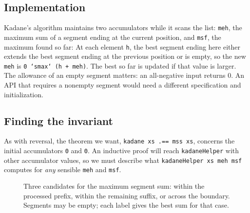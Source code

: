 \documentclass[acmsmall,screen,review,anonymous,nonacm]{acmart}
\newcommand{\code}[1]{\texttt{#1}}
\begin{document}
\subsection{Implementation}

Kadane's algorithm maintains two accumulators while it scans the list:
\code{meh}, the maximum sum of a segment ending at the current position, and
\code{msf}, the maximum found so far:
At each element \code{h}, the best segment ending here either extends the best
segment ending at the previous position or is empty, so the new \code{meh} is
\code{0 `smax` (h + meh)}. The best so far is updated if that value is larger.
The allowance of an empty segment matters: an all-negative input returns 0.
An API that requires a nonempty segment would need a different specification
and initialization.

\subsection{Finding the invariant}

As with reversal, the theorem we want, \code{kadane xs .== mss xs}, concerns the
initial accumulators \code{0} and \code{0}. An inductive proof will reach
\code{kadaneHelper} with other accumulator values, so we must describe what
\code{kadaneHelper xs meh msf} computes for \emph{any} sensible \code{meh} and
\code{msf}.

\begin{figure}[htbp]
\centering
{}
\caption{Three candidates for the maximum segment sum: within the processed
prefix, within the remaining suffix, or across the boundary. Segments may be
empty; each label gives the best sum for that case.}
\label{fig:kadane}
\end{figure}
\end{document}
